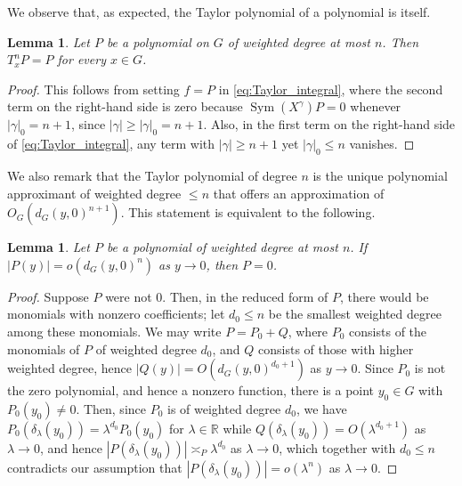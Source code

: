 \documentclass[11pt,reqno]{amsart}
\newtheorem{lemma}[theorem]{Lemma}
\newcommand{\1}{\mathbf 1}
\begin{document}
We observe that, as expected, the Taylor polynomial of a polynomial is itself.
\begin{lemma}\label{lem:taylor_identity}
    Let $P$ be a polynomial on $G$ of weighted degree at most $n$. Then $T^n_xP=P$ for every $x\in G$.
\end{lemma}
\begin{proof}
    This follows from setting $f=P$ in \eqref{eq:Taylor_integral}, where the second term on the right-hand side is zero because $\operatorname{Sym}\left(X^\gamma\right)P=0$ whenever $\left|\gamma\right|_0=n+1$, since $\left|\gamma\right|\ge \left|\gamma\right|_0=n+1$. Also, in the first term on the right-hand side of \eqref{eq:Taylor_integral}, any term with $\left|\gamma\right|\ge n+1$ yet $\left|\gamma\right|_0\le n$ vanishes.
\end{proof}
We also remark that the Taylor polynomial of degree $n$ is the unique polynomial approximant of weighted degree $\le n$ that offers an approximation of $O_G\left(d_G\left(y,0\right)^{n+1}\right)$. This statement is equivalent to the following.
\begin{lemma}
    Let $P$ be a polynomial of weighted degree at most $n$. If $\left|P\left(y\right)\right|=o\left(d_G\left(y,0\right)^{n}\right)$ as $y\to 0$, then $P=0$.
\end{lemma}
\begin{proof}
    Suppose $P$ were not $0$. Then, in the reduced form of $P$, there would be monomials with nonzero coefficients; let $d_0\le n$ be the smallest weighted degree among these monomials. We may write $P=P_0+Q$, where $P_0$ consists of the monomials of $P$ of weighted degree $d_0$, and $Q$ consists of those with higher weighted degree, hence $\left|Q\left(y\right)\right|=O\left(d_G\left(y,0\right)^{d_0+1}\right)$ as $y\to 0$. Since $P_0$ is not the zero polynomial, and hence a nonzero function, there is a point $y_0\in G$ with $P_0\left(y_0\right)\neq 0$. Then, since $P_0$ is of weighted degree $d_0$, we have $P_0\left(\delta_\lambda\left(y_0\right)\right)=\lambda^{d_0}P_0\left(y_0\right)$ for $\lambda\in \mathbb{R}$ while $Q\left(\delta_\lambda\left(y_0\right)\right)=O\left(\lambda^{d_0+1}\right)$ as $\lambda\to 0$, and hence $\left|P\left(\delta_\lambda\left(y_0\right)\right)\right|\asymp_{P} \lambda^{d_0}$ as $\lambda\to 0$, which together with $d_0\le n$ contradicts our assumption that $\left|P\left(\delta_\lambda\left(y_0\right)\right)\right|=o\left(\lambda^n\right)$ as $\lambda\to 0$.
\end{proof}
\end{document}
